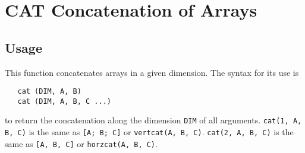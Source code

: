 \section{CAT Concatenation of Arrays}

\subsection{Usage}

This function concatenates arrays in a given
dimension.  The syntax for its use is
\begin{verbatim}
   cat (DIM, A, B)
   cat (DIM, A, B, C ...)
\end{verbatim}
to return the concatenation along the dimension \verb|DIM| of all arguments. 
\verb|cat(1, A, B, C)| is the same as \verb|[A; B; C]| or \verb|vertcat(A, B, C)|.
\verb|cat(2, A, B, C)| is the same as \verb|[A, B, C]| or \verb|horzcat(A, B, C)|.
